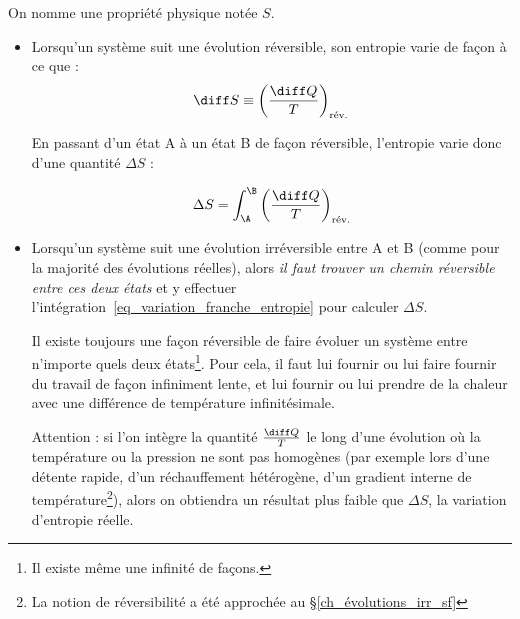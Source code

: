 		On nomme  une propriété physique notée $S$.
		
		\begin{itemize}
			\item Lorsqu’un système suit une évolution réversible, son entropie varie de façon à ce que :
				\begin{equation}
					\diff S \equiv  \left( \frac{\diff Q}{T} \right)_\text{rév.}
					\label{def_entropie}
				\end{equation}


				En passant d’un état A à un état B de façon réversible, l’entropie varie donc d’une quantité $\Delta S$ :
	
				\begin{equation}
					\Delta S = \int_\A^\B \left( \frac{\diff Q}{T} \right)_\text{rév.}
					\label{eq_variation_franche_entropie}
				\end{equation}


			\item Lorsqu’un système suit une évolution irréversible entre A et B (comme pour la majorité des évolutions réelles), alors \emph{il faut trouver un chemin réversible entre ces deux états} et y effectuer l’intégration~\ref{eq_variation_franche_entropie} pour calculer $\Delta S$. 

				Il existe toujours une façon réversible de faire évoluer un système entre n’importe quels deux états\footnote{Il existe même une infinité de façons.}. Pour cela, il faut lui fournir ou lui faire fournir du travail de façon infiniment lente, et lui fournir ou lui prendre de la chaleur avec une différence de température infinitésimale.
				
				Attention : si l’on intègre la quantité $\frac{\diff Q}{T}$ le long d’une évolution où la température ou la pression ne sont pas homogènes (par exemple lors d’une détente rapide, d’un réchauffement hétérogène, d’un gradient interne de température\footnote{La notion de réversibilité a été approchée au \S\ref{ch_évolutions_irr_sf}}), alors on obtiendra un résultat plus faible que $\Delta S$, la variation d’entropie réelle. 
				
			\end{itemize}


